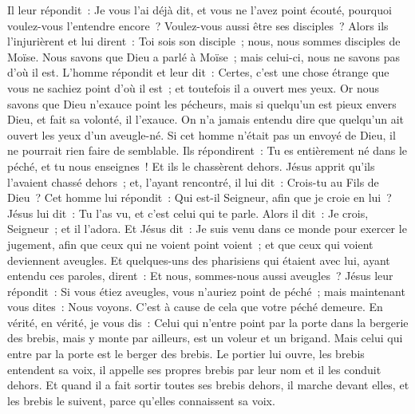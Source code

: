 \begin{multicols}{2}
Il leur répondit~: Je vous l'ai déjà dit, et vous ne l'avez point écouté, pourquoi voulez-vous l'entendre encore~? Voulez-vous aussi être ses disciples~?
Alors ils l'injurièrent et lui dirent~: Toi sois son disciple~; nous, nous sommes disciples de Moïse.
Nous savons que Dieu a parlé à Moïse~; mais celui-ci, nous ne savons pas d'où il est.
L'homme répondit et leur dit~: Certes, c'est une chose étrange que vous ne sachiez point d'où il est~; et toutefois il a ouvert mes yeux.
Or nous savons que Dieu n'exauce point les pécheurs, mais si quelqu'un est pieux envers Dieu, et fait sa volonté, il l'exauce.
On n'a jamais entendu dire que quelqu'un ait ouvert les yeux d'un aveugle-né.
Si cet homme n'était pas un envoyé de Dieu, il ne pourrait rien faire de semblable.
Ils répondirent~: Tu es entièrement né dans le péché, et tu nous enseignes~! Et ils le chassèrent dehors.
Jésus apprit qu'ils l'avaient chassé dehors~; et, l'ayant rencontré, il lui dit~: Crois-tu au Fils de Dieu~?
Cet homme lui répondit~: Qui est-il Seigneur, afin que je croie en lui~?
Jésus lui dit~: Tu l'as vu, et c'est celui qui te parle.
Alors il dit~: Je crois, Seigneur~; et il l'adora.
Et Jésus dit~: Je suis venu dans ce monde pour exercer le jugement, afin que ceux qui ne voient point voient~; et que ceux qui voient deviennent aveugles.
Et quelques-uns des pharisiens qui étaient avec lui, ayant entendu ces paroles, dirent~: Et nous, sommes-nous aussi aveugles~?
Jésus leur répondit~: Si vous étiez aveugles, vous n'auriez point de péché~; mais maintenant vous dites~: Nous voyons. C'est à cause de cela que votre péché demeure.
\VerseOne{}En vérité, en vérité, je vous dis~: Celui qui n'entre point par la porte dans la bergerie des brebis, mais y monte par ailleurs, est un voleur et un brigand.
Mais celui qui entre par la porte est le berger des brebis.
Le portier lui ouvre, les brebis entendent sa voix, il appelle ses propres brebis par leur nom et il les conduit dehors.
Et quand il a fait sortir toutes ses brebis dehors, il marche devant elles, et les brebis le suivent, parce qu'elles connaissent sa voix.

\end{multicols}
